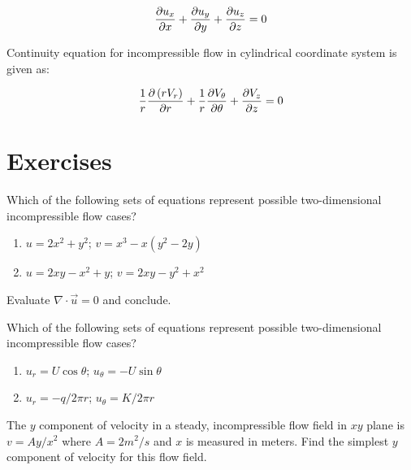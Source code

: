 $$ {\partial u_x \over \partial x} + {\partial u_y \over \partial y} + {\partial u_z \over \partial z} = 0 $$

Continuity equation for incompressible flow in cylindrical coordinate system is given as: 

$$ {1 \over r} {\partial \left( r V_r \right) \over \partial r} +  {1 \over r} {\partial V_\theta \over \partial \theta} + {\partial V_z \over \partial z} = 0 $$


\section{Exercises}

\begin{question}
\item Which of the following sets of equations represent possible two-dimensional incompressible flow cases?
\begin{enumerate}
	\item $u=2x^2+y^2$; $v=x^3-x(y^2-2y)$
	\item $u=2xy-x^2+y$; $v=2xy-y^2+x^2$
\end{enumerate}
\end{question}
\begin{solution}[print]
Evaluate $\nabla \cdot \vec{u} = 0$ and conclude. 
\end{solution}


\begin{question}
\item Which of the following sets of equations represent possible two-dimensional incompressible flow cases?

\begin{enumerate}
\item $u_r=U\cos\theta$; $u_\theta=-U\sin\theta$
\item $u_r={-q / 2\pi r}$; $u_\theta={K/2\pi r}$
\end{enumerate}
\end{question}
\begin{solution}[print]
\end{solution}


\begin{question}
The $y$ component of velocity in a steady, incompressible flow field in $xy$ plane is $v = {Ay/x^2}$ where $A=2m^2/s$ and $x$ is measured in meters. Find the simplest $y$ component of velocity for this flow field.
\end{question}
\begin{solution}[print]
\end{solution}

